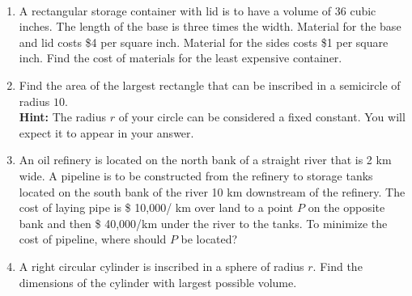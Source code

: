 \documentclass[11pt,fleqn]{article}
\begin{document}
\begin{center}
  \Large{}\\
\end{center}


\begin{enumerate}
\item A rectangular storage container with lid is to have a volume of 36 cubic inches. The length of the base is three times the width. Material for the base and lid costs \$4 per square inch. Material for the sides costs \$1 per square inch. Find the cost of materials for the least expensive container.
\vfill
\item Find the area of the largest rectangle that can
  be inscribed in a semicircle of radius $10$.\\ \textbf{Hint:} The radius $r$ of your circle can be considered a fixed constant. You will expect it to appear in your answer. 
  \vfill
  \newpage
 \item An oil refinery is located on the north bank of a
straight river that is 2 km wide. A pipeline is to be constructed from
the refinery to storage tanks located on the south bank of the river 10
km downstream of the refinery. The cost of laying pipe is \$ 10,000/
km over land to a point $P$ on the opposite bank and then \$ 40,000/km
under the river to the tanks. To minimize the cost of pipeline, where
should $P$ be located? 
\vfill

\item A right circular cylinder is inscribed in a sphere of radius $r.$ Find the dimensions of the cylinder with largest possible volume.

\vfill

\end{enumerate}


\end{document}
